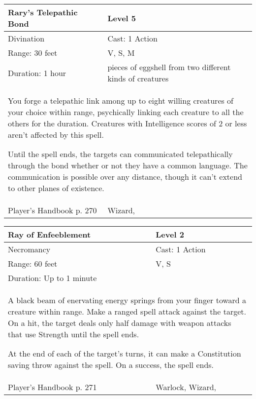 \documentclass[11pt]{report}
\begin{document}
\begin{table}[H]
	\begin{tabular}{||p{6cm}|p{6cm}||}
		\hline\hline
		\bf{Rary’s Telepathic Bond} & Level 5\\ \hline
		Divination & Cast: 1 Action\\ \hline
		Range: 30 feet & V, S, M\\ \hline
		Duration: 1 hour & pieces of eggshell from two different kinds of creatures\\ \hline
		\multicolumn{2}{||p{12cm}||}{You forge a telepathic link among up to eight willing creatures of your choice within range, psychically linking each creature to all the others for the duration. Creatures with Intelligence scores of 2 or less aren’t affected by this spell.

Until the spell ends, the targets can communicated telepathically through the bond whether or not they have a common language. The communication is possible over any distance, though it can’t extend to other planes of existence.}\\ \hline
Player's Handbook p. 270 & Wizard, \\ \hline\hline
	\end{tabular}
\end{table}

\begin{table}[H]
	\begin{tabular}{||p{6cm}|p{6cm}||}
		\hline\hline
		\bf{Ray of Enfeeblement} & Level 2\\ \hline
		Necromancy & Cast: 1 Action\\ \hline
		Range: 60 feet & V, S\\ \hline
		Duration: Up to 1 minute & \\ \hline
		\multicolumn{2}{||p{12cm}||}{A black beam of enervating energy springs from your finger toward a creature within range.
Make a ranged spell attack against the target. On a hit, the target deals only half damage with weapon attacks that use Strength until the spell ends.

At the end of each of the target’s turns, it can make a Constitution saving throw against the spell. On a success, the spell ends.}\\ \hline
Player's Handbook p. 271 & Warlock, Wizard, \\ \hline\hline
	\end{tabular}
\end{table}
\end{document}
